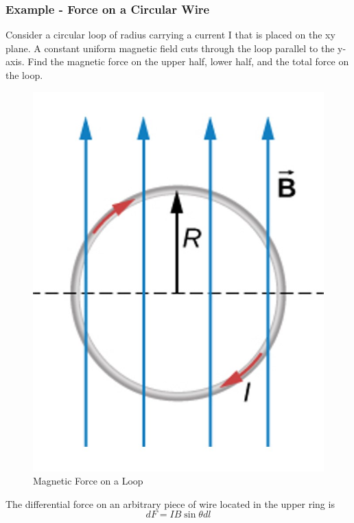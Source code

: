 \documentclass[14pt]{memoir}
\begin{document}
\subsubsection{Example - Force on a Circular Wire}

Consider a circular loop of radius carrying a current I that is placed on the xy plane. A constant uniform magnetic field cuts through the loop parallel to the y-axis. Find the magnetic force on the upper half, lower half, and the total force on the loop.

\begin{figure}[H]
\begin{center}
\includegraphics[scale=0.50]{fig/fig_11_14.jpg}
\caption{Magnetic Force on a Loop}
\label{fig:11_14}
\end{center}
\end{figure}

The differential force on an arbitrary piece of wire located in the upper ring is 
\begin{equation}
dF = I B \sin{\theta} dl
\end{equation}
\end{document}
